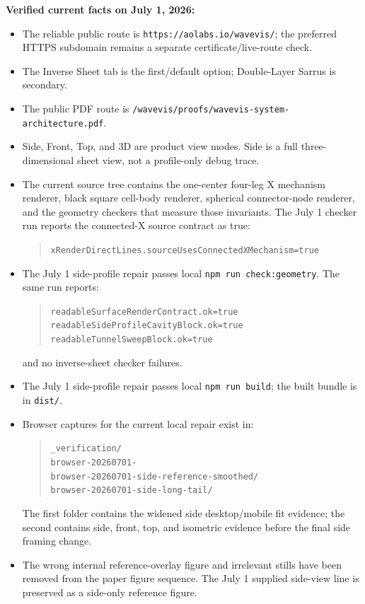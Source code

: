 \documentclass[12pt,letterpaper]{article}
\newcommand{\code}[1]{\texttt{#1}}
\newcommand{\pathcode}[1]{\nolinkurl{#1}}
\begin{document}
\textbf{Verified current facts on July 1, 2026:}
\begin{itemize}
  \item The reliable public route is \code{https://aolabs.io/wavevis/}; the preferred HTTPS subdomain remains a separate certificate/live-route check.
  \item The Inverse Sheet tab is the first/default option; Double-Layer Sarrus is secondary.
  \item The public PDF route is \code{/wavevis/proofs/wavevis-system-architecture.pdf}.
  \item Side, Front, Top, and 3D are product view modes. Side is a full three-dimensional sheet view, not a profile-only debug trace.
  \item The current source tree contains the one-center four-leg X mechanism renderer, black square cell-body renderer, spherical connector-node renderer, and the geometry checkers that measure those invariants. The July 1 checker run reports the connected-X source contract as true:
  \begin{quote}\footnotesize\raggedright
  \pathcode{xRenderDirectLines.sourceUsesConnectedXMechanism=true}
  \end{quote}
  \item The July 1 side-profile repair passes local \code{npm run check:geometry}. The same run reports:
  \begin{quote}\footnotesize\raggedright
  \pathcode{readableSurfaceRenderContract.ok=true}\\
  \pathcode{readableSideProfileCavityBlock.ok=true}\\
  \pathcode{readableTunnelSweepBlock.ok=true}
  \end{quote}
  and no inverse-sheet checker failures.
  \item The July 1 side-profile repair passes local \code{npm run build}; the built bundle is in \code{dist/}.
  \item Browser captures for the current local repair exist in:
  \begin{quote}\footnotesize
  \pathcode{_verification/}\\
  \pathcode{browser-20260701-}\\
  \pathcode{browser-20260701-side-reference-smoothed/}\\
  \pathcode{browser-20260701-side-long-tail/}
  \end{quote}
  The first folder contains the widened side desktop/mobile fit evidence; the second contains side, front, top, and isometric evidence before the final side framing change.
  \item The wrong internal reference-overlay figure and irrelevant stills have been removed from the paper figure sequence. The July 1 supplied side-view line is preserved as a side-only reference figure.
\end{itemize}
\end{document}
